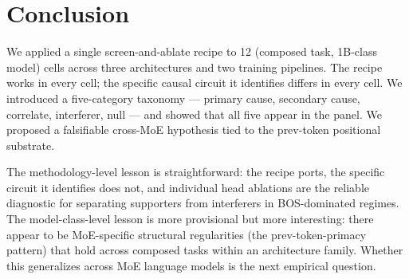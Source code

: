 \documentclass[11pt]{article}
\begin{document}
\section{Conclusion}
\label{sec:conclusion}

We applied a single screen-and-ablate recipe to 12 (composed task, 1B-class model) cells across three architectures and two training pipelines. The recipe works in every cell; the specific causal circuit it identifies differs in every cell. We introduced a five-category taxonomy --- primary cause, secondary cause, correlate, interferer, null --- and showed that all five appear in the panel. We proposed a falsifiable cross-MoE hypothesis tied to the prev-token positional substrate.

The methodology-level lesson is straightforward: the recipe ports, the specific circuit it identifies does not, and individual head ablations are the reliable diagnostic for separating supporters from interferers in BOS-dominated regimes. The model-class-level lesson is more provisional but more interesting: there appear to be MoE-specific structural regularities (the prev-token-primacy pattern) that hold across composed tasks within an architecture family. Whether this generalizes across MoE language models is the next empirical question.


\end{document}
